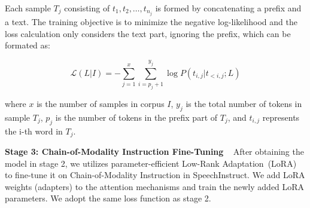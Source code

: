 \noindent Each sample $T_j$ consisting of $t_1, t_2, \ldots, t_{n_j}$ is formed by concatenating a prefix and a text. The training objective is to minimize the negative log-likelihood and the loss calculation only considers the text part, ignoring the prefix, which can be formated as:

\begin{equation}
\mathcal{L}(L|I) = -\sum_{j=1}^{x}\sum_{i=p_j+1}^{y_j} \log P(t_{i,j} | t_{<i,j}; L)
\end{equation}

\noindent where $x$ is the number of samples in corpus $I$, $y_j$ is the total number of tokens in sample $T_j$, $p_j$ is the number of tokens in the prefix part of $T_j$, and $t_{i,j}$ represents the i-th word in $T_j$.

\noindent\textbf{Stage 3: Chain-of-Modality Instruction Fine-Tuning }~
After obtaining the model in stage 2, we utilizes
parameter-efficient Low-Rank Adaptation~(LoRA)~\citep{hu2021lora} to fine-tune it on Chain-of-Modality Instruction in SpeechInstruct.  We add LoRA weights (adapters) to the attention mechanisms and train the newly added LoRA parameters. We adopt the same loss function as stage 2.

